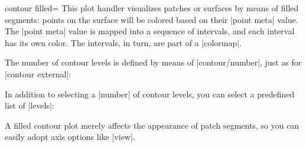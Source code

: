 {{\begin{plottype}[/pgfplots]{
    contour filled=\textcolor{black}{}%
}
    This plot handler visualizes patches or surfaces by means of filled
    segments: points on the surface will be colored based on their |point meta|
    value. The |point meta| value is mapped into a sequence of intervals, and
    each interval has its own color. The intervals, in turn, are part of a
    |colormap|.
\pgfplotsexpensiveexample
\begin{codeexample}[]
\end{codeexample}
    The number of contour levels is defined by means of |contour/number|, just
    as for |contour external|:

\pgfplotsexpensiveexample
\begin{codeexample}[]
\end{codeexample}

    In addition to selecting a |number| of contour levels, you can select a
    predefined list of |levels|:
\pgfplotsexpensiveexample
\begin{codeexample}[]
\end{codeexample}
    A filled contour plot merely affects the appearance of patch segments, so
    you can easily adopt axis options like |view|.


\end{plottype}}}

